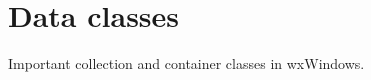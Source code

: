 \chapter{Data classes}\label{chapdataclasses}
%
%
\setfooter{\thepage}{}{}{}{}{\thepage}%

Important collection and container classes in wxWindows.

